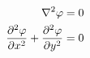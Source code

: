 \documentclass[report_template_main.tex]{subfiles}
\begin{document}
\begin{align*}
    \displaystyle %
    \nabla^2\varphi                         &= 0 \\
    \pd[2]{\varphi}{x} + \pd[2]{\varphi}{y} &= 0
\end{align*}


%
%
%








\end{document}
